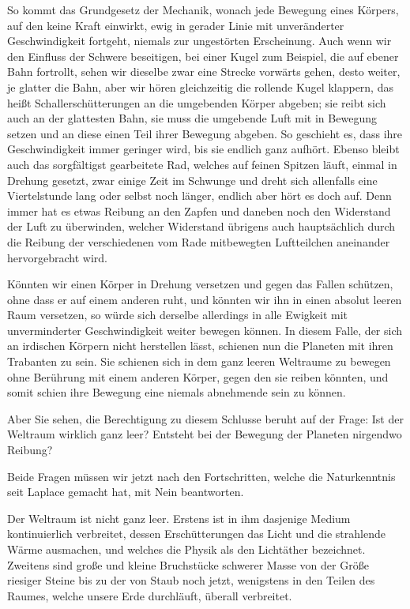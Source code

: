 \documentclass[a4paper, 11pt, oneside, german]{article}
\begin{document}
So kommt das Grundgesetz der Mechanik, wonach jede Bewegung eines Körpers, auf den keine Kraft einwirkt, ewig in gerader Linie mit unveränderter Geschwindigkeit fortgeht, niemals zur ungestörten Erscheinung. Auch wenn wir den Einfluss der Schwere beseitigen, bei einer Kugel zum Beispiel, die auf ebener Bahn fortrollt, sehen wir dieselbe zwar eine Strecke vorwärts gehen, desto weiter, je glatter die Bahn, aber wir hören gleichzeitig die rollende Kugel klappern, das heißt Schallerschütterungen an die umgebenden Körper abgeben; sie reibt sich auch an der glattesten Bahn, sie muss die umgebende Luft mit in Bewegung setzen und an diese einen Teil ihrer Bewegung abgeben. So geschieht es, dass ihre Geschwindigkeit immer geringer wird, bis sie endlich ganz aufhört. Ebenso bleibt auch das sorgfältigst gearbeitete Rad, welches auf feinen Spitzen läuft, einmal in Drehung gesetzt, zwar einige Zeit im Schwunge und dreht sich allenfalls eine Viertelstunde lang oder selbst noch länger, endlich aber hört es doch auf. Denn immer hat es etwas Reibung an den Zapfen und daneben noch den Widerstand der Luft zu überwinden, welcher Widerstand übrigens auch hauptsächlich durch die Reibung der verschiedenen vom Rade mitbewegten Luftteilchen aneinander hervorgebracht wird.

Könnten wir einen Körper in Drehung versetzen und gegen das Fallen schützen, ohne dass er auf einem anderen ruht, und könnten wir ihn in einen absolut leeren Raum versetzen, so würde sich derselbe allerdings in alle Ewigkeit mit unverminderter Geschwindigkeit weiter bewegen können. In diesem Falle, der sich an irdischen Körpern nicht herstellen lässt, schienen nun die Planeten mit ihren Trabanten zu sein. Sie schienen sich in dem ganz leeren Weltraume zu bewegen ohne Berührung mit einem anderen Körper, gegen den sie reiben könnten, und somit schien ihre Bewegung eine niemals abnehmende sein zu können.

Aber Sie sehen, die Berechtigung zu diesem Schlusse beruht auf der Frage: Ist der Weltraum wirklich ganz leer? Entsteht bei der Bewegung der Planeten nirgendwo Reibung?

Beide Fragen müssen wir jetzt nach den Fortschritten, welche die Naturkenntnis seit Laplace gemacht hat, mit Nein beantworten.

Der Weltraum ist nicht ganz leer. Erstens ist in ihm dasjenige Medium kontinuierlich verbreitet, dessen Erschütterungen das Licht und die strahlende Wärme ausmachen, und welches die Physik als den Lichtäther bezeichnet. Zweitens sind große und kleine Bruchstücke schwerer Masse von der Größe riesiger Steine bis zu der von Staub noch jetzt, wenigstens in den Teilen des Raumes, welche unsere Erde durchläuft, überall verbreitet.
\end{document}
